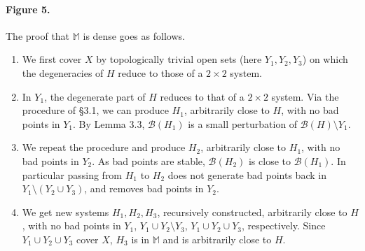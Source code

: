 \documentclass[11pt]{article}
\numberwithin{equation}{section}
\let\mathcal\mathscr
\newenvironment{enumeratei}
{\bgroup\def\theenumi{\roman{enumi}}\def\theenumii{\arabic{enumii}}\begin{enumerate}}
{\end{enumerate}\egroup}
\theoremstyle{definition}
\newcommand{\BB}{\mathcal{B}}
\newcommand{\Mm}{\mathbb{M}}
\begin{document}
\paragraph{Figure 5.} The proof that $\Mm$ is dense goes as follows.
\begin{enumeratei}
\item[(a)] We first cover $X$ by topologically trivial open sets (here $Y_1,Y_2,Y_3$) on which the degeneracies of $H$ reduce to those of a $2\times2$ system.
\item[(b)] In $Y_1$, the degenerate part of $H$ reduces to that of a $2\times2$ system. Via the procedure of \S3.1, we can produce $H_1$, arbitrarily close to $H$, with no bad points in $Y_1$. By Lemma 3.3, $\BB(H_1)$ is a small perturbation of $\BB(H)\setminus Y_1$.
\item[(c)] We repeat the procedure and produce $H_2$, arbitrarily close to $H_1$, with no bad points in $Y_2$. As bad points are stable, $\BB(H_2)$ is close to $\BB(H_1)$. In particular passing from $H_1$ to $H_2$ does not generate bad points back in $Y_1\setminus(Y_2\cup Y_3)$, and removes bad points in $Y_2$.
\item[(d)] We get new systems $H_1,H_2,H_3$, recursively constructed, arbitrarily close to $H$, with no bad points in $Y_1$, $Y_1\cup Y_2\setminus Y_3$, $Y_1\cup Y_2\cup Y_3$, respectively. Since $Y_1\cup Y_2\cup Y_3$ cover $X$, $H_3$ is in $\Mm$ and is arbitrarily close to $H$.
\end{enumeratei}

\end{document}
